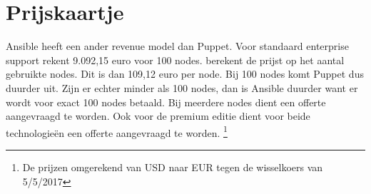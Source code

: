  \section{Prijskaartje}

Ansible heeft een ander revenue model dan Puppet. Voor standaard enterprise support rekent \textcite{ansibleprice} 9.092,15 euro voor 100 nodes. \textcite{puppetprice} berekent de prijst op het aantal gebruikte nodes. Dit is dan 109,12 euro per node. Bij 100 nodes komt Puppet dus duurder uit. Zijn er echter minder als 100 nodes, dan is Ansible duurder want er wordt voor exact 100 nodes betaald. Bij meerdere nodes dient een offerte aangevraagd te worden. Ook voor de premium editie dient voor beide technologie\"en een offerte aangevraagd te worden. \footnote{De prijzen omgerekend van USD naar EUR tegen de wisselkoers van 5/5/2017}

